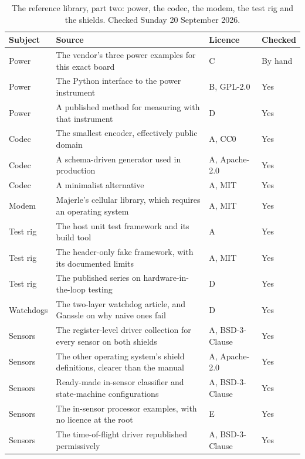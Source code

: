 \begin{table}[H]\centering\small
\begin{tabular}{p{28mm}p{80mm}p{22mm}p{18mm}}
\toprule
Subject & Source & Licence & Checked \\
\midrule
Power & The vendor's three power examples for this exact board & C & By hand \\
Power & The Python interface to the power instrument & B, GPL-2.0 & Yes \\
Power & A published method for measuring with that instrument & D & Yes \\
Codec & The smallest encoder, effectively public domain & A, CC0 & Yes \\
Codec & A schema-driven generator used in production & A, Apache-2.0 & Yes \\
Codec & A minimalist alternative & A, MIT & Yes \\
Modem & Majerle's cellular library, which requires an operating system & A, MIT & Yes \\
Test rig & The host unit test framework and its build tool & A & Yes \\
Test rig & The header-only fake framework, with its documented limits & A, MIT & Yes \\
Test rig & The published series on hardware-in-the-loop testing & D & Yes \\
Watchdogs & The two-layer watchdog article, and Ganssle on why naive ones fail & D & Yes \\
Sensors & The register-level driver collection for every sensor on both shields & A, BSD-3-Clause & Yes \\
Sensors & The other operating system's shield definitions, clearer than the manual & A, Apache-2.0 & Yes \\
Sensors & Ready-made in-sensor classifier and state-machine configurations & A, BSD-3-Clause & Yes \\
Sensors & The in-sensor processor examples, with no licence at the root & E & Yes \\
Sensors & The time-of-flight driver republished permissively & A, BSD-3-Clause & Yes \\
\bottomrule
\end{tabular}
\caption{The reference library, part two: power, the codec, the modem, the test rig and the shields. Checked Sunday 20 September 2026.}
\end{table}

